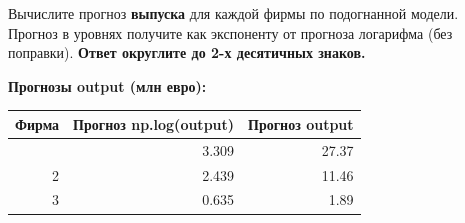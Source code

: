 \documentclass[
  russian,
]{article}
\newcounter{none} %
\begin{document}
Вычислите прогноз \textbf{выпуска} для каждой фирмы по подогнанной
модели. Прогноз в уровнях получите как экспоненту от прогноза логарифма
(без поправки). \textbf{Ответ округлите до 2-х десятичных знаков.}

\textbf{Прогнозы output (млн евро):}

{\def\LTcaptype{none} %
\begin{longtable}[]{@{}rrr@{}}
\toprule\noalign{}
Фирма & Прогноз np.log(output) & Прогноз output \\
\midrule\noalign{}
\endhead
\bottomrule\noalign{}
\endlastfoot
1 & 3.309 & 27.37 \\
2 & 2.439 & 11.46 \\
3 & 0.635 & 1.89 \\
\end{longtable}
}
\end{document}
